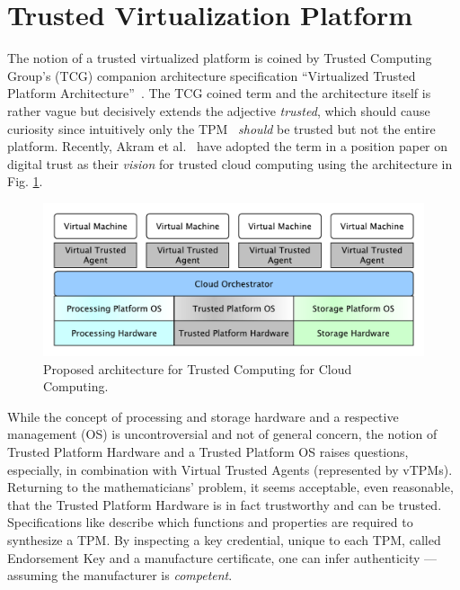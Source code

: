 \section{Trusted Virtualization Platform}
The notion of a trusted virtualized platform is coined by Trusted Computing Group's (TCG) companion architecture specification ``Virtualized Trusted Platform Architecture''~\cite{VTPA}. The TCG coined term and the architecture itself is rather vague but decisively extends the adjective \emph{trusted}, which should cause curiosity since intuitively only the TPM~\cite{ISOTPM} \emph{should} be trusted but not the entire platform. Recently, Akram et al.~\cite{digitaltrust} have adopted the term in a position paper on digital trust as their \emph{vision} for trusted cloud computing using the architecture in Fig. \ref{fig:vplatform}.
\begin{figure}[!ht]
  \centering
  \includegraphics[scale=0.35]{figures/vplatform}
  \caption{Proposed architecture for Trusted Computing for Cloud Computing.~\cite{digitaltrust}}
  \label{fig:vplatform}
\end{figure}

While the concept of processing and storage hardware and a respective management (OS) is uncontroversial and not of general concern, the notion of Trusted Platform Hardware and a Trusted Platform OS raises questions, especially, in combination with Virtual Trusted Agents (represented by vTPMs).
Returning to the mathematicians' problem, it seems acceptable, even reasonable, that the Trusted Platform Hardware is in fact trustworthy and can be trusted. Specifications like \cite{ISOTPM} describe which functions and properties are required to synthesize a TPM. By inspecting a key credential, unique to each TPM, called Endorsement Key and a manufacture certificate, one can infer authenticity --- assuming the manufacturer is \emph{competent}.

